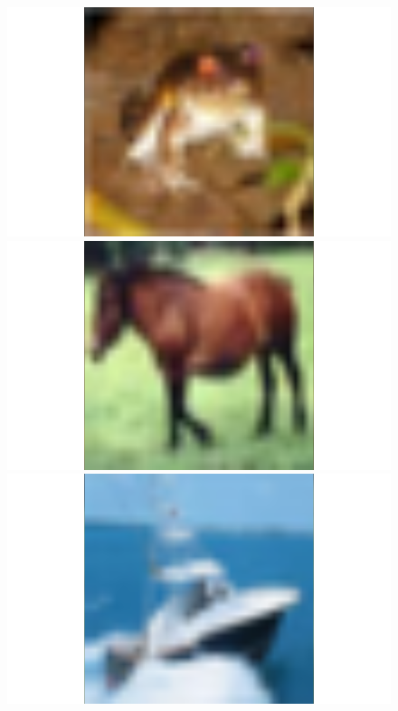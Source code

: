 \begin{figure}
\begin{minipage}{0.19\textwidth}
 \end{minipage}
 \begin{minipage}{0.19\textwidth}
  \includegraphics[width=1.5\textwidth]{../plots/cifar10-class6}
 \end{minipage}
 \begin{minipage}{0.19\textwidth}
  \includegraphics[width=1.5\textwidth]{../plots/cifar10-class7}
 \end{minipage}
 \begin{minipage}{0.19\textwidth}
  \includegraphics[width=1.5\textwidth]{../plots/cifar10-class8}

\end{minipage}
\end{figure}
